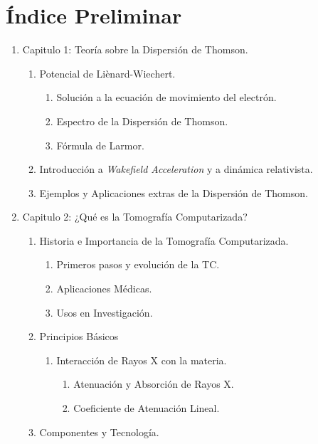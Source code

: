 \section{Índice Preliminar}


\begin{enumerate}
    \item Capitulo 1: Teoría sobre la Dispersión de Thomson.
    \begin{enumerate}
        \item Potencial de Liènard-Wiechert.
        \begin{enumerate}
            \item Solución a la ecuación de movimiento del electrón.
            \item Espectro de la Dispersión de Thomson.
            \item Fórmula de Larmor.
        \end{enumerate}
        \item Introducción a \emph{Wakefield Acceleration} y a dinámica relativista.
        \item Ejemplos y Aplicaciones extras de la Dispersión de Thomson.
    \end{enumerate}
    \item Capitulo 2: ¿Qué es la Tomografía Computarizada?
    \begin{enumerate}
        \item Historia e Importancia de la Tomografía Computarizada.
        \begin{enumerate}
            \item Primeros pasos y evolución de la TC.
            \item Aplicaciones Médicas.
            \item Usos en Investigación.
        \end{enumerate}
        \item Principios Básicos
        \begin{enumerate}
            \item Interacción de Rayos X con la materia.
            \begin{enumerate}
                \item Atenuación y Absorción de Rayos X.
                \item Coeficiente de Atenuación Lineal.
            \end{enumerate}
        \end{enumerate}
        \item Componentes y Tecnología.

\end{enumerate}
\end{enumerate}
